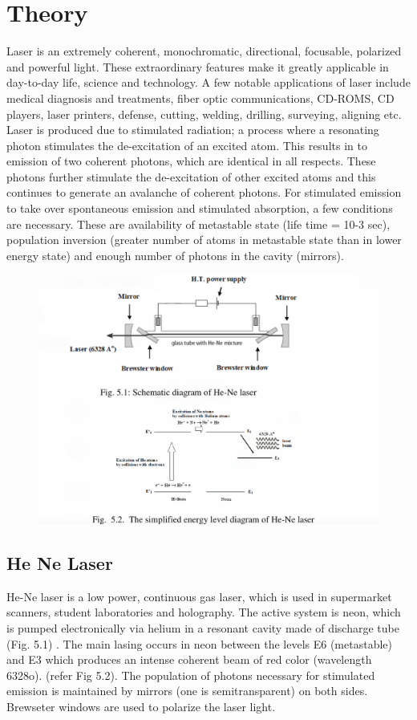 \documentclass[11pt]{article}
\begin{document}
	
	\section{Theory}
	Laser is an extremely coherent, monochromatic, directional, focusable, polarized and
	powerful light. These extraordinary features make it greatly applicable in day-to-day life, science
	and technology. A few notable applications of laser include medical diagnosis and treatments,
	fiber optic communications, CD-ROMS, CD players, laser printers, defense, cutting, welding,
	drilling, surveying, aligning etc.\\

	Laser is produced due to stimulated radiation; a process where a resonating photon
stimulates the de-excitation of an excited atom. This results in to emission of two coherent
photons, which are identical in all respects. These photons further stimulate the de-excitation of
other excited atoms and this continues to generate an avalanche of coherent photons. For
stimulated emission to take over spontaneous emission and stimulated absorption, a few
conditions are necessary. These are availability of metastable state (life time = 10-3 sec),
population inversion (greater number of atoms in metastable state than in lower energy state) and
enough number of photons in the cavity (mirrors).
	\begin{figure}[H]
		\centering
		\includegraphics[scale=0.5]{1.png}
		\label{it}
	\end{figure}
	
\subsection{He Ne Laser}
He-Ne laser is a low power, continuous gas laser, which is used in supermarket scanners, student
laboratories and holography. The active system is neon, which is pumped electronically via
helium in a resonant cavity made of discharge tube (Fig. 5.1) . The main lasing occurs in neon
between the levels E6 (metastable) and E3 which produces an intense coherent beam of red color
(wavelength 6328o). (refer Fig 5.2). The population of photons necessary for stimulated emission
is maintained by mirrors (one is semitransparent) on both sides. Brewseter windows are used to
polarize the laser light.
\end{document}
